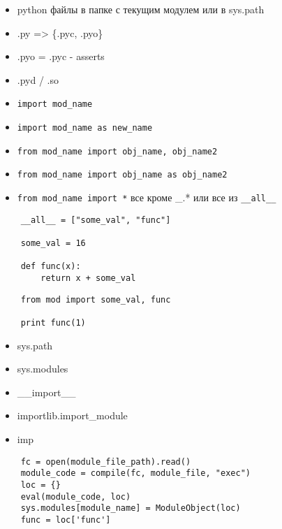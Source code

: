 \documentclass{article}
\begin{document}
\LARGE

\begin{itemize}
	\item python файлы в папке с текущим модулем или в sys.path
	\item .py => \{.pyc, .pyo\}
	\item .pyo = .pyc - asserts
	\item .pyd / .so
	\item \lstinline!import mod_name!
	\item \lstinline!import mod_name as new_name!
	\item \lstinline!from mod_name import obj_name, obj_name2!
	\item \lstinline!from mod_name import obj_name as obj_name2!
	\item \lstinline!from mod_name import *! все кроме \_.* или все из \lstinline!__all__!
\end{itemize}
\newpage

{
\LARGE \vspace{15pt}
\begin{lstlisting}
	__all__ = ["some_val", "func"]
	
	some_val = 16

	def func(x):
		return x + some_val
\end{lstlisting}
}

{
\LARGE \vspace{15pt}
\begin{lstlisting}
	from mod import some_val, func

	print func(1)
\end{lstlisting}
}
\newpage

\begin{itemize}
\item sys.path
\item sys.modules
\item \_\_import\_\_
\item importlib.import\_module
\item imp
\end{itemize}
\newpage

{
\LARGE \vspace{15pt}
\begin{lstlisting}
	fc = open(module_file_path).read()
	module_code = compile(fc, module_file, "exec")
	loc = {}
	eval(module_code, loc)
	sys.modules[module_name] = ModuleObject(loc)
	func = loc['func']
\end{lstlisting}
}
\newpage
\end{document}

